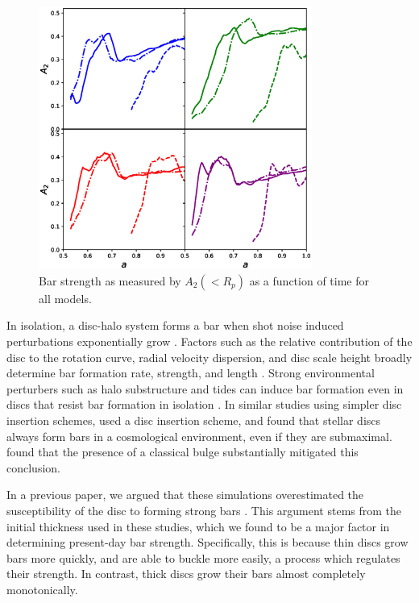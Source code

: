 \begin{figure}
	\centering
	\includegraphics[width=0.8\textwidth]{../figures/a_2_all_models_four_panel.eps}
	\caption{Bar strength as measured by $A_2(<R_p)$ as a function of time for all models.} \label{fig:a_2}
\end{figure}



In isolation, a disc-halo system forms a bar when shot noise induced perturbations exponentially grow \citep{EfstathiouShotNoise}. Factors such as the relative contribution of the disc to the rotation curve, radial velocity dispersion, and disc scale height broadly determine bar formation rate, strength, and length \citep{AthanassoulaSellwood1986,ChristodoulouStability1995, Klypin2009, Sellwood2013, bauer2018b}. 
Strong environmental perturbers such as halo substructure and tides can induce bar formation even in discs that resist bar formation in isolation \citep{gauthier_2006, kazantzidis2008, purcell2011}. In similar studies using simpler disc insertion schemes, \citet{debuhr_2012,ys_2015} used a disc insertion scheme, and found that stellar discs always form bars in a cosmological environment, even if they are submaximal. \citet{ys_2015} found that the presence of a classical bulge substantially mitigated this conclusion. 


In a previous paper, we argued that these simulations overestimated the susceptibility of the disc to forming strong bars \citep{bauer2018b}. This argument stems from the initial thickness used in these studies, which we found to be a major factor in determining present-day bar strength. Specifically, this is because thin discs grow bars more quickly, and are able to buckle more easily, a process which regulates their strength. In contrast, thick discs grow their bars almost completely monotonically.


